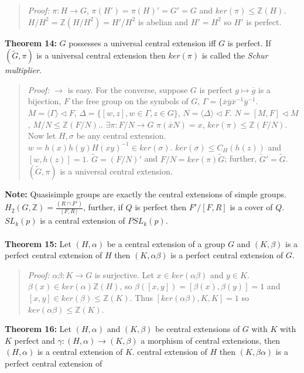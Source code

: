 \begin{quote}
\emph{Proof:} $\pi: H \rightarrow G$, $\pi(H')= \pi(H)'=G'=G$ and $ker(\pi) \le {\mathbb Z}(H)$.
$H/H^2 = {\mathbb Z}(H/H^2)= H'/H^2$ is abelian and $H'=H^2$ so $H'$ is perfect.
\end{quote}
{\bf Theorem 14:}
$G$ possesses a universal central extension iff $G$ is perfect.
If $(\tilde{G}, \pi)$ is a universal central extension then $ker(\pi)$ is called
the \emph{Schur multiplier}.
\begin{quote}
\emph{Proof:}  $\rightarrow$ is easy.  For the converse, suppose $G$ is perfect
$g \mapsto {\overline g}$ is a bijection, $F$ the free group on the symbols of $G$,
$\Gamma= \{ {\overline x} {\overline y} {\overline x}^{-1} {\overline y}^{-1}$.
$M= \langle \Gamma \rangle \lhd F$, $\Delta= \{ [w,z], w \in \Gamma, z \in G \}$, 
$N= \langle \Delta \rangle \lhd F$.
$N=[M,F] \lhd M$, $M/N \le {\mathbb Z}(F/N)$.. $\exists \pi: F/N \rightarrow G$
$\pi({\overline x}N)= x$, $ker(\pi) \le {\mathbb Z}(F/N)$.  Now let $H, \sigma$ be any
central extension.  $w= h(x) h(y) H(xy)^{-1} \in ker(\sigma)$.  $ker(\sigma) \le C_H(h(z))$
and $[w,h(z)]=1$.  $\tilde{G} =(F/N)'$ and $F/N = ker(\pi) \tilde{G}$; further,
$\tilde{G}' = \tilde{G}$.  $(\tilde{G}, \pi)$ is a universal central extension.
\end{quote}
{\bf Note:} Quasisimple groups are exactly the central extensions of simple groups.  
$H_2(G,{\mathbb Z}) = {\frac {(R \cap F')} {[F,R]}}$, further, if $Q$ is
perfect then  $F'/[F,R]$ is a cover of $Q$. $SL_k(p)$ is a central extension of
$PSL_k(p)$.
\\
\\
{\bf Theorem 15:}
Let $(H, \alpha)$ be a central extension of a group $G$ and $(K, \beta)$ is a perfect
central extension of $H$ then $(K, \alpha \beta )$ is a perfect central extension of
$G$.
\begin{quote}
\emph{Proof:}  
$\alpha \beta : K \rightarrow G$ is surjective.  Let $x \in ker(\alpha \beta)$ and
$y \in K$.  $\beta(x) \in ker( \alpha ) {\mathbb Z}(H)$, so 
$\beta([x,y]) = [\beta(x), \beta(y)] =1$ and $[x,y] \in ker ( \beta ) \le {\mathbb Z}(K)$.
Thus $[ker( \alpha \beta ), K, K] = 1$ so $ker( \alpha \beta ) \le  {\mathbb Z}(K)$.
\end{quote}
{\bf Theorem 16:}
Let $(H, \alpha)$ and $(K, \beta)$ be central extensions of $G$ with $K$ with
$K$ perfect and $\gamma: (H, \alpha) \rightarrow (K, \beta)$ a morphism of central
extensions, then $(H, \alpha)$ is a central extension of $K$.
central extension of $H$ then $(K, \beta \alpha)$ is a perfect central extension of
